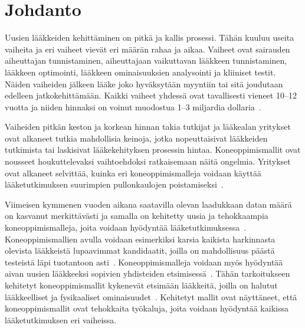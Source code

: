 \documentclass[finnish,twoside,censored,tkt,sw-line]{HYthesisML}
\begin{document}
\newpage
\mytableofcontents{}
\mainmatter{}


%
%
%
% 


\chapter{Johdanto}

Uusien lääkkeiden kehittäminen on pitkä ja kallis prosessi.
Tähän kuuluu useita vaiheita ja eri vaiheet vievät eri määrän rahaa ja aikaa.
Vaiheet ovat sairauden aiheuttajan tunnistaminen, aiheuttajaan vaikuttavan lääkkeen tunnistaminen, lääkkeen optimointi, lääkkeen ominaisuuksien analysointi ja kliiniset testit.
Näiden vaiheiden jälkeen lääke joko hyväksytään myyntiin tai sitä joudutaan edelleen jatkokehittämään.
Kaikki vaiheet yhdessä ovat tavallisesti vieneet 10--12 vuotta ja niiden hinnaksi on voinut muodostua 1--3 miljardia dollaria~\cite{EkinsSean2019Emlf}.

Vaiheiden pitkän keston ja korkean hinnan takia tutkijat ja lääkealan yritykset ovat alkaneet tutkia mahdollisia keinoja, jotka nopeuttaisivat lääkkeiden tutkimista tai laskisivat lääkekehityksen prosessin hintaa.
Koneoppimismallit ovat nousseet houkuttelevaksi vaihtoehdoksi ratkaisemaan näitä ongelmia.
Yritykset ovat alkaneet selvittää, kuinka eri koneoppimismalleja voidaan käyttää lääketutkimuksen suurimpien pullonkaulojen poistamiseksi~\cite{EkinsSean2019Emlf}.

Viimeisen kymmenen vuoden aikana saatavilla olevan laadukkaan datan määrä on kasvanut merkittävästi ja samalla on kehitetty uusia ja tehokkaampia koneoppimismalleja, joita voidaan hyödyntää lääketutkimuksessa~\cite{ButlerKeithT2018Mlfm,VamathevanJessica2019Aoml}.
Koneoppimismallien avulla voidaan esimerkiksi karsia kaikista harkinnasta olevista lääkkeistä lupaavimmat kandidaatit, joilla on mahdollisuus päästä testeistä läpi tuotantoon asti~\cite{GayvertKaitlyn}.
Koneoppimismalleja voidaan myös hyödyntää aivan uusien lääkkeeksi sopivien yhdisteiden etsimisessä~\cite{ShinBonggun,ShaharHarelAndKiraRadinsky}.
Tähän tarkoitukseen kehitetyt koneoppimismallit kykenevät etsimään lääkkeitä, joilla on halutut lääkkeelliset ja fysikaaliset ominaisuudet~\cite{VamathevanJessica2019Aoml}.
Kehitetyt mallit ovat näyttäneet, että koneoppimismallit ovat tehokkaita työkaluja, joita voidaan hyödyntää kaikissa lääketutkimuksen eri vaiheissa.
\end{document}
